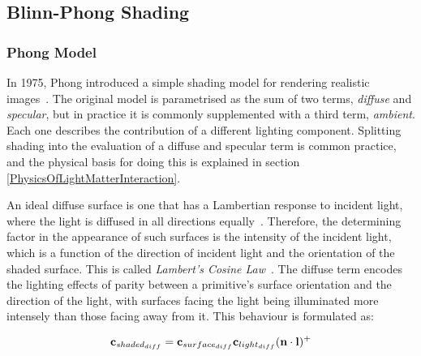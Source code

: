 \subsection{Blinn-Phong Shading} \label{BlinnPhongShading}

\subsubsection{Phong Model}

In 1975, Phong introduced a simple shading model for rendering realistic images~\cite{PhongShading}. The original model is parametrised as the sum of two terms, \textit{diffuse} and \textit{specular}, but in practice it is commonly supplemented with a third term, \textit{ambient}. Each one describes the contribution of a different lighting component. Splitting shading into the evaluation of a diffuse and specular term is common practice, and the physical basis for doing this is explained in section \ref{PhysicsOfLightMatterInteraction}.

An ideal diffuse surface is one that has a Lambertian response to incident light, where the light is diffused in all directions equally~\cite{Lambert}. Therefore, the determining factor in the appearance of such surfaces is the intensity of the incident light, which is a function of the direction of incident light and the orientation of the shaded surface. This is called \textit{Lambert's Cosine Law}~\cite{Lambert}. The diffuse term encodes the lighting effects of parity between a primitive's surface orientation and the direction of the light, with surfaces facing the light being illuminated more intensely than those facing away from it. This behaviour is formulated as:

\begin{equation}
	\mathbf{c}_{shaded_{diff}} = \mathbf{c}_{surface_{diff}}\mathbf{c}_{light_{diff}}(\mathbf{n}\cdot\mathbf{l})^+
\end{equation}

